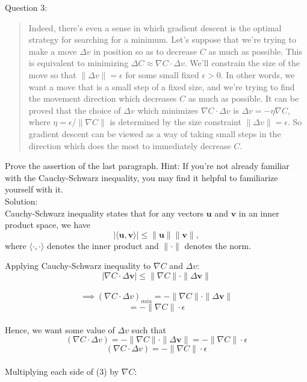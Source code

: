 \documentclass[18pt]{article}
\begin{document}
Question 3: 
\begin{quote}
    Indeed, there's even a sense in which gradient descent is the optimal strategy for searching for a minimum. Let's suppose that we're trying to make a move $\Delta v$ in position so as to decrease $C$ as much as possible. This is equivalent to minimizing $\Delta C \approx \nabla C \cdot \Delta v$. We'll constrain the size of the move so that $\|\Delta v\|=\epsilon$ for some small fixed $\epsilon>0$. In other words, we want a move that is a small step of a fixed size, and we're trying to find the movement direction which decreases $C$ as much as possible. It can be proved that the choice of $\Delta v$ which minimizes $\nabla C \cdot \Delta v$ is $\Delta v=-\eta \nabla C$, where $\eta=\epsilon/\|\nabla C\|$ is determined by the size constraint $\|\Delta v\|=\epsilon$. So gradient descent can be viewed as a way of taking small steps in the direction which does the most to immediately decrease $C$.
\end{quote}
Prove the assertion of the last paragraph. Hint: If you're not already familiar with the Cauchy-Schwarz inequality, you may find it helpful to familiarize yourself with it.\\
Solution: \\
Cauchy-Schwarz inequality states that 
for any vectors $\mathbf{u}$ and $\mathbf{v}$ in an inner product space, we have
\begin{equation}
    \left|\langle \mathbf{u}, \mathbf{v}\rangle \right| \leq \|\mathbf{u}\| \|\mathbf{v}\|,
\end{equation}
where $\langle \cdot, \cdot \rangle$ denotes the inner product and $\|\cdot\|$ denotes the norm.

Applying Cauchy-Schwarz inequality to $\nabla C$ and $\Delta v$:
\begin{equation}
|\nabla C \cdot \Delta \mathbf{v}| \leq \|\nabla C\| \cdot \|\Delta \mathbf{v}\|
\end{equation}\\
$$\implies
({\nabla C\cdot \Delta v})_{min}=-\|\nabla C\| \cdot \|\Delta \mathbf{v}\|$$
$$=-\|\nabla C\| \cdot \epsilon$$ \\
Hence, we want some value of $\Delta v$ such that$$
({\nabla C\cdot \Delta v})=-\|\nabla C\| \cdot \|\Delta \mathbf{v}\|=-\|\nabla C\| \cdot \epsilon
$$
\begin{equation}
({\nabla C\cdot \Delta v})=-\|\nabla C\| \cdot \epsilon
\end{equation}\\
Multiplying each side of (3) by $\nabla C$:
\end{document}
